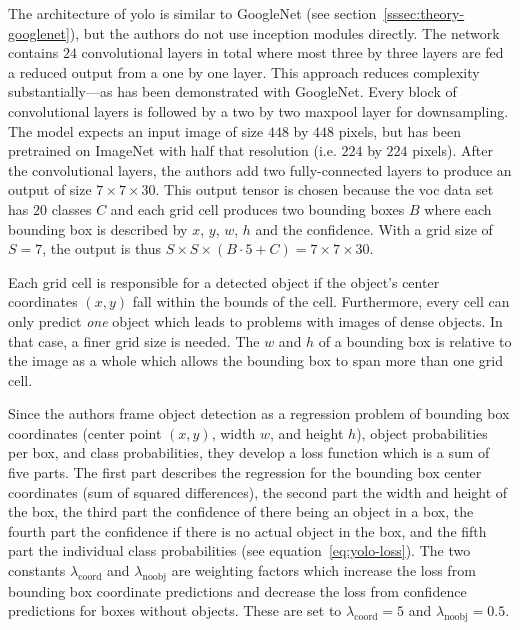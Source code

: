 \documentclass[draft,final]{vutinfth} %
\begin{document}
The architecture of \gls{yolo} is similar to GoogleNet (see
section~\ref{sssec:theory-googlenet}), but the authors do not use
inception modules directly. The network contains $24$ convolutional
layers in total where most three by three layers are fed a reduced
output from a one by one layer. This approach reduces complexity
substantially---as has been demonstrated with GoogleNet. Every block of
convolutional layers is followed by a two by two maxpool layer for
downsampling. The model expects an input image of size $448$ by $448$
pixels, but has been pretrained on ImageNet with half that resolution
(i.e. $224$ by $224$ pixels). After the convolutional layers, the
authors add two fully-connected layers to produce an output of size
$7 \times 7 \times 30$. This output tensor is chosen because the \gls{voc} data
set has $20$ classes $C$ and each grid cell produces two bounding
boxes $B$ where each bounding box is described by $x$, $y$, $w$, $h$
and the confidence. With a grid size of $S = 7$, the output is thus
$S \times S \times (B \cdot 5 + C) = 7 \times 7 \times 30$.

Each grid cell is responsible for a detected object if the object's
center coordinates $(x,y)$ fall within the bounds of the
cell. Furthermore, every cell can only predict \emph{one} object which
leads to problems with images of dense objects. In that case, a finer
grid size is needed. The $w$ and $h$ of a bounding box is relative to
the image as a whole which allows the bounding box to span more than
one grid cell.

Since the authors frame object detection as a regression problem of
bounding box coordinates (center point $(x,y)$, width $w$, and height
$h$), object probabilities per box, and class probabilities, they
develop a loss function which is a sum of five parts. The first part
describes the regression for the bounding box center coordinates (sum
of squared differences), the second part the width and height of the
box, the third part the confidence of there being an object in a box,
the fourth part the confidence if there is no actual object in the
box, and the fifth part the individual class probabilities (see
equation~\ref{eq:yolo-loss}). The two constants
$\lambda_{\mathrm{coord}}$ and $\lambda_{\mathrm{noobj}}$ are weighting factors
which increase the loss from bounding box coordinate predictions and
decrease the loss from confidence predictions for boxes without
objects. These are set to $\lambda_{\mathrm{coord}} = 5$ and
$\lambda_{{\mathrm{noobj}}} = 0.5$.
\end{document}

